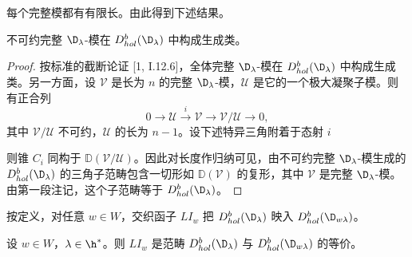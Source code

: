 每个完整模都有有限长。由此得到下述结果。

\begin{lemma}\label{lem:03.6.1}
不可约完整 $\D_\lambda$-模在 $D^b_{hol}(\D_\lambda)$ 中构成生成类。
\end{lemma}

\begin{proof}
按标准的截断论证 [1, I.12.6]，全体完整 $\D_\lambda$-模在 $D^b_{hol}(\D_\lambda)$ 中构成生成类。另一方面，设 $\mathcal{V}$ 是长为 $n$ 的完整 $\D_\lambda$-模，$\mathcal{U}$ 是它的一个极大凝聚子模。则有正合列
$$0\longrightarrow\mathcal{U}\xrightarrow{\ i\ }\mathcal{V}\longrightarrow\mathcal{V}/\mathcal{U}\longrightarrow 0,$$
其中 $\mathcal{V}/\mathcal{U}$ 不可约，$\mathcal{U}$ 的长为 $n-1$。设下述特异三角附着于态射 $i$
\begin{center}
\end{center}
则锥 $C_i$ 同构于 $\mathbb{D}(\mathcal{V}/\mathcal{U})$。因此对长度作归纳可见，由不可约完整 $\D_\lambda$-模生成的 $D^b_{hol}(\D_\lambda)$ 的三角子范畴包含一切形如 $\mathbb{D}(\mathcal{V})$ 的复形，其中 $\mathcal{V}$ 是完整 $\D_\lambda$-模。由第一段注记，这个子范畴等于 $D^b_{hol}(\D_\lambda)$。
\end{proof}

按定义，对任意 $w\in W$，交织函子 $LI_w$ 把 $D^b_{hol}(\D_\lambda)$ 映入 $D^b_{hol}(\D_{w\lambda})$。

\begin{theorem}\label{thm:03.6.2}
设 $w\in W$，$\lambda\in\h^*$。则 $LI_w$ 是范畴 $D^b_{hol}(\D_\lambda)$ 与 $D^b_{hol}(\D_{w\lambda})$ 的等价。
\end{theorem}

